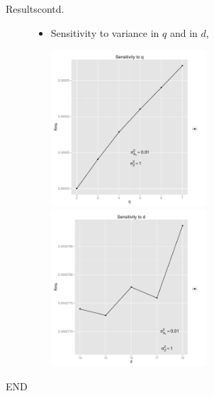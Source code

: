 \documentclass{beamer}
\begin{document}
\begin{frame}{Results}{contd.}
	\begin{figure}
	\vspace{-0.3 in}
		\begin{itemize}\item{Sensitivity to variance in $q$ and in $d$}, \newline\vspace{-0 in}
			\begin{center}
				\vspace*{-0.1 in}
				\hspace*{-0.4in}
				\includegraphics[width=0.55\textwidth]{Sen_q.pdf} 
	 			 \includegraphics[width=0.55\textwidth]{Sen_d.pdf} 
			\end{center}
		\end{itemize}
	\end{figure}
		\vspace{-0.in}
\end{frame}

\begin{frame}{}{}
	\begin{center}
        		\Large{END}          
      \end{center}
\end{frame}
\end{document}
